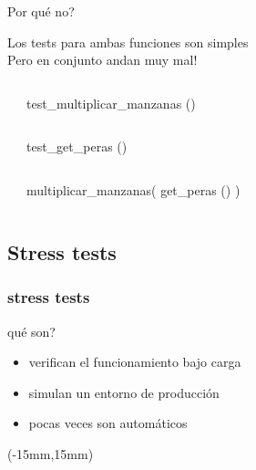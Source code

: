 \begin{frame}[t, shrink=25]{\textquestiondown Por qu\'e no?}
\begin{center}
	\huge
	Los tests para ambas funciones son simples \\
	Pero en conjunto andan muy mal!
\end{center}

\begin{columns}
	\begin{center}	 \end{center}
	test\_multiplicar\_manzanas ()
\end{columns}

\begin{columns}
	\begin{center}	 \end{center}
	test\_get\_peras ()
\end{columns}

\begin{columns}
	\begin{center}	 \end{center}
	multiplicar\_manzanas( get\_peras () )
\end{columns}
\end{frame}


\subsection{Stress tests}
\begin{frame}[t]
\frametitle{stress tests}
\textquestiondown qu\'e son?
\begin{itemize}
	\item verifican el funcionamiento bajo carga
	\item simulan un entorno de producci\'on
	\item pocas veces son autom\'aticos
\end{itemize}
\begin{textblock*}{30mm}(-15mm,15mm)
\end{textblock*}
\end{frame}

